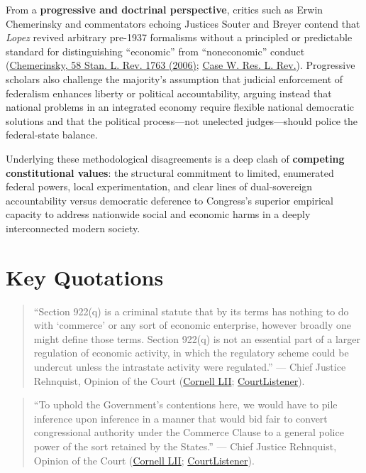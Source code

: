 \documentclass[12pt]{article}
\begin{document}
From a \textbf{progressive and doctrinal perspective}, critics such as Erwin Chemerinsky and commentators echoing Justices Souter and Breyer contend that \textit{Lopez} revived arbitrary pre-1937 formalisms without a principled or predictable standard for distinguishing ``economic'' from ``noneconomic'' conduct (\href{http://www.stanfordlawreview.org/wp-content/uploads/sites/3/2010/04/chemerinsky.pdf}{Chemerinsky, 58 Stan. L. Rev. 1763 (2006)}; \href{https://scholarlycommons.law.case.edu/cgi/viewcontent.cgi?article=4685&context=caselrev}{Case W. Res. L. Rev.}). Progressive scholars also challenge the majority's assumption that judicial enforcement of federalism enhances liberty or political accountability, arguing instead that national problems in an integrated economy require flexible national democratic solutions and that the political process---not unelected judges---should police the federal-state balance.

Underlying these methodological disagreements is a deep clash of \textbf{competing constitutional values}: the structural commitment to limited, enumerated federal powers, local experimentation, and clear lines of dual-sovereign accountability versus democratic deference to Congress's superior empirical capacity to address nationwide social and economic harms in a deeply interconnected modern society.

\section{Key Quotations}
\begin{quote}
``Section 922(q) is a criminal statute that by its terms has nothing to do with `commerce' or any sort of economic enterprise, however broadly one might define those terms. Section 922(q) is not an essential part of a larger regulation of economic activity, in which the regulatory scheme could be undercut unless the intrastate activity were regulated.''
--- Chief Justice Rehnquist, Opinion of the Court (\href{https://www.law.cornell.edu/supct/html/93-1260.ZO.html}{Cornell LII}; \href{https://www.courtlistener.com/opinion/117927/united-states-v-lopez/}{CourtListener}).
\end{quote}

\begin{quote}
``To uphold the Government's contentions here, we would have to pile inference upon inference in a manner that would bid fair to convert congressional authority under the Commerce Clause to a general police power of the sort retained by the States.''
--- Chief Justice Rehnquist, Opinion of the Court (\href{https://www.law.cornell.edu/supct/html/93-1260.ZO.html}{Cornell LII}; \href{https://www.courtlistener.com/opinion/117927/united-states-v-lopez/}{CourtListener}).
\end{quote}
\end{document}
